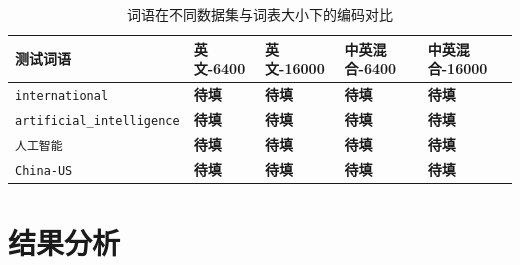 \documentclass[a4paper,12pt]{ctexart} %
\begin{document}
\begin{table}[H]
    \centering
    \begin{tabular}{p{} p{} p{} p{} p{}}
        \toprule
        测试词语 & 英文-6400 & 英文-16000 & 中英混合-6400 & 中英混合-16000 \\
        \midrule
        \texttt{international} & \textbf{待填} & \textbf{待填} & \textbf{待填} & \textbf{待填} \\
        \texttt{artificial\_intelligence} & \textbf{待填} & \textbf{待填} & \textbf{待填} & \textbf{待填} \\
        \texttt{人工智能} & \textbf{待填} & \textbf{待填} & \textbf{待填} & \textbf{待填} \\
        \texttt{China-US} & \textbf{待填} & \textbf{待填} & \textbf{待填} & \textbf{待填} \\
        \bottomrule
    \end{tabular}
    \caption{词语在不同数据集与词表大小下的编码对比}
\end{table}


\section{结果分析}
\end{document}
